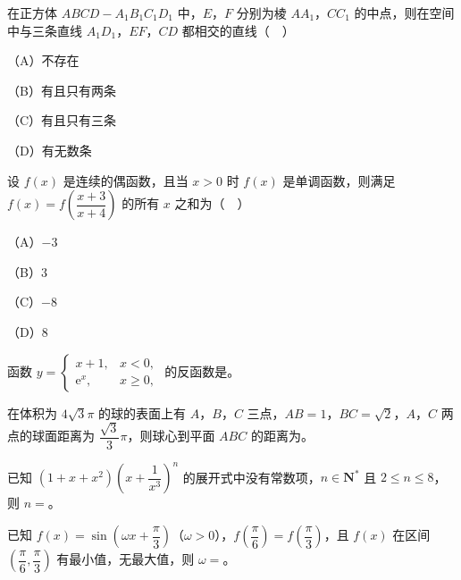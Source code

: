 \begin{question}
在正方体 $ABCD-A_1B_1C_1D_1$ 中，$E$，$F$ 分别为棱 $AA_1$，$CC_1$ 的中点，则在空间中与三条直线 $A_1D_1$，$EF$，$CD$ 都相交的直线（　）

（A）不存在

（B）有且只有两条

（C）有且只有三条

（D）有无数条

\end{question}
\begin{question}
设 $f(x)$ 是连续的偶函数，且当 $x>0$ 时 $f(x)$ 是单调函数，则满足 $f(x)=f\left(\dfrac{x+3}{x+4}\right)$ 的所有 $x$ 之和为（　）

（A）$-3$

（B）$3$

（C）$-8$

（D）$8$

\end{question}

\begin{question}
函数 $y=\begin{cases}x+1,&x<0,\\ \mathrm e^x,&x\geqslant0,\end{cases}$ 的反函数是\gkblank{}。

\end{question}
\begin{question}
在体积为 $4\sqrt3\pi$ 的球的表面上有 $A$，$B$，$C$ 三点，$AB=1$，$BC=\sqrt2$，$A$，$C$ 两点的球面距离为 $\dfrac{\sqrt3}{3}\pi$，则球心到平面 $ABC$ 的距离为\gkblank{}。

\end{question}
\begin{question}
已知 $\left(1+x+x^2\right)\left(x+\dfrac1{x^3}\right)^n$ 的展开式中没有常数项，$n\in\mathbf N^*$ 且 $2\leqslant n\leqslant8$，则 $n=$\gkblank{}。

\end{question}
\begin{question}
已知 $f(x)=\sin\left(\omega x+\dfrac{\pi}{3}\right)$（$\omega>0$），$f\left(\dfrac{\pi}{6}\right)=f\left(\dfrac{\pi}{3}\right)$，且 $f(x)$ 在区间 $\left(\dfrac{\pi}{6},\dfrac{\pi}{3}\right)$ 有最小值，无最大值，则 $\omega=$\gkblank{}。

\end{question}

